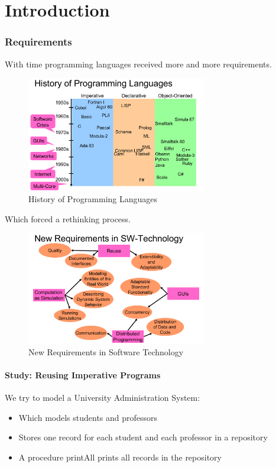 \part{Introduction}
\section{Requirements}
With time programming languages received more and more requirements.
\begin{figure}[h!]
  \centering
    \includegraphics[width=0.7\textwidth]{img/01_programming_languages}
      \caption{History of Programming Languages}

\end{figure}

Which forced a rethinking process.
\begin{figure}[h!]
  \centering
    \includegraphics[width=0.7\textwidth]{img/01_new_requirements}
      \caption{New Requirements in Software Technology}
\end{figure}

\subsection{Study: Reusing Imperative Programs}
We try to model a University Administration System:
\begin{itemize}
 \item Which models students and professors
 \item Stores one record for each student and each professor in a repository
 \item A procedure printAll prints all records in the repository
\end{itemize}

